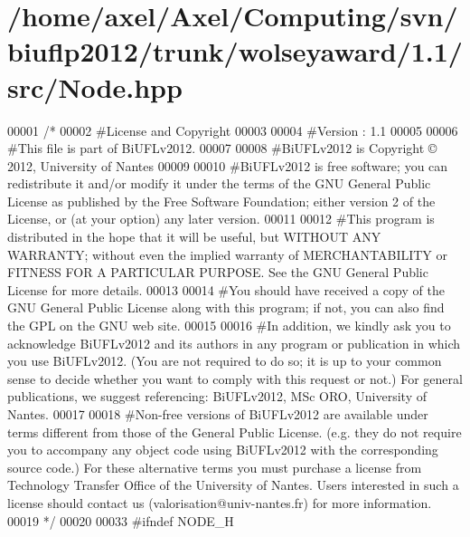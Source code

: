 \hypertarget{Node_8hpp_source}{\section{/home/axel/\-Axel/\-Computing/svn/biuflp2012/trunk/wolseyaward/1.1/src/\-Node.hpp}
}

\begin{DoxyCode}
00001 \textcolor{comment}{/*}
00002 \textcolor{comment}{ #License and Copyright}
00003 \textcolor{comment}{ }
00004 \textcolor{comment}{ #Version : 1.1}
00005 \textcolor{comment}{ }
00006 \textcolor{comment}{ #This file is part of BiUFLv2012.}
00007 \textcolor{comment}{ }
00008 \textcolor{comment}{ #BiUFLv2012 is Copyright © 2012, University of Nantes}
00009 \textcolor{comment}{ }
00010 \textcolor{comment}{ #BiUFLv2012 is free software; you can redistribute it and/or modify it under
       the terms of the GNU General Public License as published by the Free Software
       Foundation; either version 2 of the License, or (at your option) any later version.}
00011 \textcolor{comment}{ }
00012 \textcolor{comment}{ #This program is distributed in the hope that it will be useful, but WITHOUT
       ANY WARRANTY; without even the implied warranty of MERCHANTABILITY or FITNESS FOR
       A PARTICULAR PURPOSE. See the GNU General Public License for more details.}
00013 \textcolor{comment}{ }
00014 \textcolor{comment}{ #You should have received a copy of the GNU General Public License along with
       this program; if not, you can also find the GPL on the GNU web site.}
00015 \textcolor{comment}{ }
00016 \textcolor{comment}{ #In addition, we kindly ask you to acknowledge BiUFLv2012 and its authors in
       any program or publication in which you use BiUFLv2012. (You are not required to
       do so; it is up to your common sense to decide whether you want to comply with
       this request or not.) For general publications, we suggest referencing: 
       BiUFLv2012, MSc ORO, University of Nantes.}
00017 \textcolor{comment}{ }
00018 \textcolor{comment}{ #Non-free versions of BiUFLv2012 are available under terms different from
       those of the General Public License. (e.g. they do not require you to accompany any
       object code using BiUFLv2012 with the corresponding source code.) For these
       alternative terms you must purchase a license from Technology Transfer Office of the
       University of Nantes. Users interested in such a license should contact us
       (valorisation@univ-nantes.fr) for more information.}
00019 \textcolor{comment}{ */}
00020 
00033 \textcolor{preprocessor}{#ifndef NODE\_H}

\end{DoxyCode}
